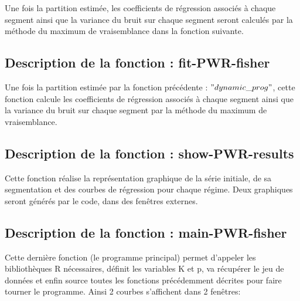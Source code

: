 \documentclass[12pt]{article}
\begin{document}
Une fois la partition estimée, les coefficients de régression associés à chaque segment ainsi que la variance du bruit sur chaque segment seront calculés par la méthode du maximum de vraisemblance dans la fonction suivante.

\smallbreak
\subsection{Description de la fonction : fit-PWR-fisher}
\label{ssec: ssprog5}
\smallbreak
Une fois la partition estimée par la fonction précédente : $"dynamic\_prog"$, cette fonction calcule les coefficients de régression associés à chaque segment ainsi que la variance du bruit sur chaque segment par la méthode du maximum de vraisemblance.
\smallbreak
\subsection{Description de la fonction : show-PWR-results}
\label{ssec: ssprog6}
\smallbreak
Cette fonction réalise la représentation graphique de la série initiale, de sa segmentation et des courbes de régression pour chaque régime. Deux graphiques seront générés par le code, dans des fenêtres externes.
\smallbreak
\subsection{Description de la fonction : main-PWR-fisher}
\label{ssec: ssprog7}
\smallbreak
Cette dernière fonction (le programme principal) permet d'appeler les bibliothèques R nécessaires, définit les variables K et p, va récupérer le jeu de données et enfin source toutes les fonctions précédemment décrites pour faire tourner le programme. Ainsi 2 courbes s'affichent dans 2 fenêtres:
\end{document}
